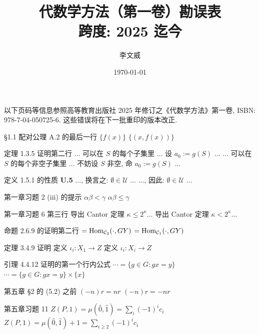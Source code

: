 \documentclass{AJerrata}
\title{\bfseries 代数学方法（第一卷）勘误表 \\ 跨度: 2025 迄今 }
\author{李文威}
\date{\today}
\begin{document}
	\maketitle
	以下页码等信息参照高等教育出版社 2025 年修订之《代数学方法》第一卷, ISBN: 978-7-04-050725-6. 这些错误将在下一批重印的版本改正.

	\begin{Errata}
		\item[\S 1.1 配对公理 A.2 的最后一行]
		\Orig $\{f(x)\}$
		\Corr $\{(x, f(x))\}$
		
		\item[定理 1.3.5 证明第二行]
		\Orig ... 可以在 $S$ 的每个子集里 ... 设 $a_0 := g(S)$ ...
		\Corr ... 可以在 $S$ 的每个非空子集里 ... 不妨设 $S$ 非空, 命 $a_0 := g(S)$ ...
		
		\item[定义 1.5.1 的性质 \bfseries{U}.5]
		\Orig ..., 换言之: $\emptyset \in \mathcal{U}$ ...
		\Corr ..., 因此: $\emptyset \in \mathcal{U}$ ...
		
		\item[第一章习题 2 (iii) 的提示]
		\Orig $\alpha\beta < \gamma$
		\Corr $\alpha\beta \leq \gamma$
		
		\item[第一章习题 6 第三行]
		\Orig 导出 Cantor 定理 $\kappa \leq 2^\kappa$...
		\Corr 导出 Cantor 定理 $\kappa < 2^\kappa$...
		
		\item[命题 2.6.9 的证明第二行]
		\Orig $= \operatorname{Hom}_{\mathcal{C}_2}(\cdot, GY)$
		\Corr $= \operatorname{Hom}_{\mathcal{C}_1}(\cdot, GY)$
		
		\item[定理 3.4.9 证明]
		\Orig 定义 $\iota_i: X_1 \to Z$
		\Corr 定义 $\iota_i: X_i \to Z$
		
		\item[引理 4.4.12 证明的第一个行内公式]
		\Orig $\cdots = \{g \in G: gx=y\}$
		\Corr $\cdots = \{g \in G: gx=y\} \times \{x\}$
		
		\item[第五章 \S 2 的 (5.2) 之前]
		\Orig $(-n)r = nr$
		\Corr $(-n)r = -nr$
		
		\item[第五章习题 11]
		\Orig $Z(P,1) = \mu(\hat{0},\hat{1}) = \sum_i (-1)^i c_i$
		\Corr $Z(P,1) = \mu(\hat{0},\hat{1}) + 1 = \sum_{i \geq 2} (-1)^i c_i$
		

\end{Errata}
\end{document}
